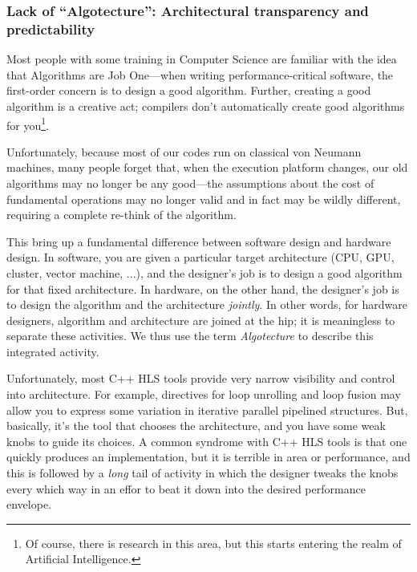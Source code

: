 
\subsubsection{Lack of ``Algotecture'': Architectural transparency and predictability}

Most people with some training in Computer Science are familiar with
the idea that Algorithms are Job One---when writing
performance-critical software, the first-order concern is to design a
good algorithm.  Further, creating a good algorithm is a creative act;
compilers don't automatically create good algorithms for
you\footnote{Of course, there is research in this area, but this
starts entering the realm of Artificial Intelligence.}.

Unfortunately, because most of our codes run on classical von Neumann
machines, many people forget that, when the execution platform
changes, our old algorithms may no longer be any good---the
assumptions about the cost of fundamental operations may no longer
valid and in fact may be wildly different, requiring a complete
re-think of the algorithm.

This bring up a fundamental difference between software design and
hardware design.  In software, you are given a particular target
architecture (CPU, GPU, cluster, vector machine, ...), and the
designer's job is to design a good algorithm for that fixed
architecture.  In hardware, on the other hand, the designer's job is
to design the algorithm and the architecture \emph{jointly}.  In other
words, for hardware designers, algorithm and architecture are joined
at the hip; it is meaningless to separate these activities.  We thus
use the term \emph{Algotecture} to describe this integrated activity.

Unfortunately, most C++ HLS tools provide very narrow visibility and
control into architecture.  For example, directives for loop unrolling
and loop fusion may allow you to express some variation in iterative
{\vs} parallel {\vs} pipelined structures.  But, basically, it's the
tool that chooses the architecture, and you have some weak knobs to
guide its choices.  A common syndrome with C++ HLS tools is that one
quickly produces an implementation, but it is terrible in area or
performance, and this is followed by a \emph{long} tail of activity in
which the designer tweaks the knobs every which way in an effor to
beat it down into the desired performance envelope.

